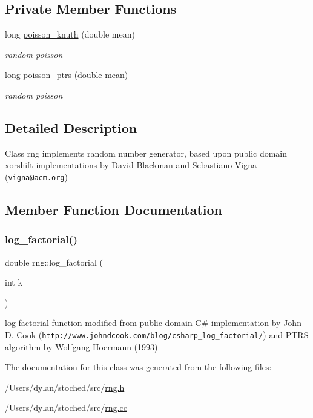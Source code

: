 \subsection*{Private Member Functions}
\begin{DoxyCompactItemize}
\item 
\mbox{\label{classrng_a1fd45ffcc5dc65bdf23311f97fd0630c}} 
long \hyperlink{classrng_a1fd45ffcc5dc65bdf23311f97fd0630c}{poisson\+\_\+knuth} (double mean)
\begin{DoxyCompactList}\small\item\em random poisson \end{DoxyCompactList}\item 
\mbox{\label{classrng_aefbbe59c0bb810de0337855e77b36747}} 
long \hyperlink{classrng_aefbbe59c0bb810de0337855e77b36747}{poisson\+\_\+ptrs} (double mean)
\begin{DoxyCompactList}\small\item\em random poisson \end{DoxyCompactList}\end{DoxyCompactItemize}


\subsection{Detailed Description}
Class rng implements random number generator, based upon public domain xorshift implementations by David Blackman and Sebastiano Vigna (\href{mailto:vigna@acm.org}{\tt vigna@acm.\+org}) 

\subsection{Member Function Documentation}
\mbox{\label{classrng_ae85750e7f1befc4d1016731248dd3e80}} 
\subsubsection{\texorpdfstring{log\+\_\+factorial()}{log\_factorial()}}
{\footnotesize\ttfamily double rng\+::log\+\_\+factorial (\begin{DoxyParamCaption}\item[{int}]{k }\end{DoxyParamCaption})}

log factorial function modified from public domain C\# implementation by John D. Cook (\href{http://www.johndcook.com/blog/csharp_log_factorial/}{\tt http\+://www.\+johndcook.\+com/blog/csharp\+\_\+log\+\_\+factorial/}) and P\+T\+RS algorithm by Wolfgang Hoermann (1993) 

The documentation for this class was generated from the following files\+:\begin{DoxyCompactItemize}
\item 
/\+Users/dylan/stoched/src/\hyperlink{rng_8h}{rng.\+h}\item 
/\+Users/dylan/stoched/src/\hyperlink{rng_8cc}{rng.\+cc}\end{DoxyCompactItemize}
